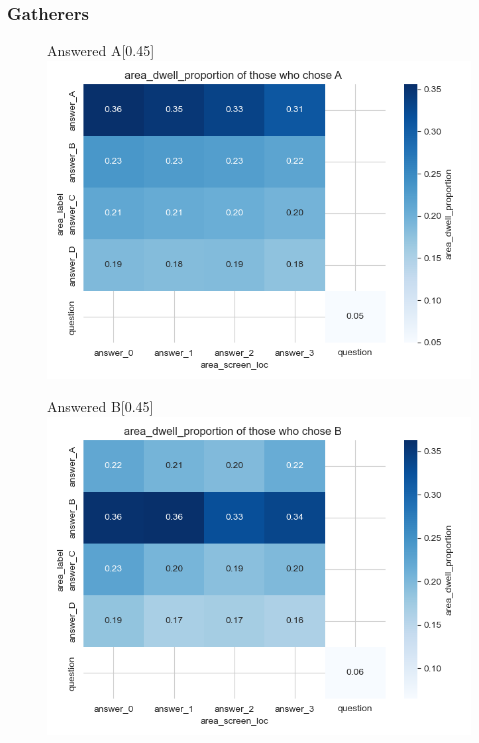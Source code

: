 \documentclass{article}
\begin{document}
\subsubsection{Gatherers}

\begin{figure}[H]
  \centering
  \begin{subcaptionbox}{Answered A\label{fig:A_dp_g}}[0.45\textwidth]
    {\centering\includegraphics[width=\linewidth]{plots/matrix_plots/matrix_area_dwell_proportion_A_gatherers.png}}
  \end{subcaptionbox}
  \hfill
  \begin{subcaptionbox}{Answered B\label{fig:B_dp_g}}[0.45\textwidth]
    {\centering\includegraphics[width=\linewidth]{plots/matrix_plots/matrix_area_dwell_proportion_B_gatherers.png}}
  \end{subcaptionbox}
  

\end{figure}
\end{document}
